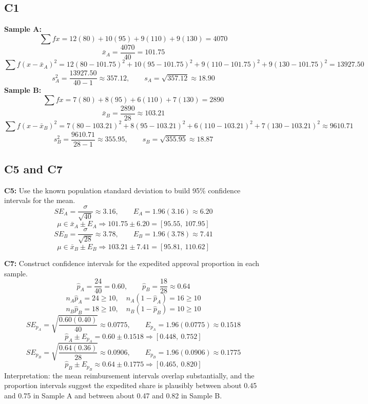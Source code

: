 \begin{ExamProblems}
		\subsection*{C1}
		\textbf{Sample A:}
		\[
		\sum f x = 12(80) + 10(95) + 9(110) + 9(130) = 4070
		\]
		\[
		\bar{x}_A = \frac{4070}{40} = 101.75
		\]
		\[
		\sum f(x-\bar{x}_A)^2 = 12(80-101.75)^2 + 10(95-101.75)^2 + 9(110-101.75)^2 + 9(130-101.75)^2 = 13927.50
		\]
		\[
		s_A^2 = \frac{13927.50}{40-1} \approx 357.12, \qquad s_A = \sqrt{357.12} \approx 18.90
		\]
		\textbf{Sample B:}
		\[
		\sum f x = 7(80) + 8(95) + 6(110) + 7(130) = 2890
		\]
		\[
		\bar{x}_B = \frac{2890}{28} \approx 103.21
		\]
		\[
		\sum f(x-\bar{x}_B)^2 = 7(80-103.21)^2 + 8(95-103.21)^2 + 6(110-103.21)^2 + 7(130-103.21)^2 \approx 9610.71
		\]
		\[
		s_B^2 = \frac{9610.71}{28-1} \approx 355.95, \qquad s_B = \sqrt{355.95} \approx 18.87
		\]

		\subsection*{C5 and C7}
		\textbf{C5:} Use the known population standard deviation to build 95\% confidence intervals for the mean.
		\[
		SE_A = \frac{\sigma}{\sqrt{40}} \approx 3.16, \qquad E_A = 1.96(3.16) \approx 6.20
		\]
		\[
		\mu \in \bar{x}_A \pm E_A \Rightarrow 101.75 \pm 6.20 = [95.55,\ 107.95]
		\]
		\[
		SE_B = \frac{\sigma}{\sqrt{28}} \approx 3.78, \qquad E_B = 1.96(3.78) \approx 7.41
		\]
		\[
		\mu \in \bar{x}_B \pm E_B \Rightarrow 103.21 \pm 7.41 = [95.81,\ 110.62]
		\]

		\textbf{C7:} Construct confidence intervals for the expedited approval proportion in each sample.
		\[
		\hat{p}_A = \frac{24}{40} = 0.60, \qquad \hat{p}_B = \frac{18}{28} \approx 0.64
		\]
		\[
		n_A\hat{p}_A = 24 \ge 10, \quad n_A(1-\hat{p}_A) = 16 \ge 10
		\]
		\[
		n_B\hat{p}_B = 18 \ge 10, \quad n_B(1-\hat{p}_B) = 10 \ge 10
		\]
		\[
		SE_{p_A} = \sqrt{\frac{0.60(0.40)}{40}} \approx 0.0775, \qquad E_{p_A} = 1.96(0.0775) \approx 0.1518
		\]
		\[
		\hat{p}_A \pm E_{p_A} = 0.60 \pm 0.1518 \Rightarrow [0.448,\ 0.752]
		\]
		\[
		SE_{p_B} = \sqrt{\frac{0.64(0.36)}{28}} \approx 0.0906, \qquad E_{p_B} = 1.96(0.0906) \approx 0.1775
		\]
		\[
		\hat{p}_B \pm E_{p_B} \approx 0.64 \pm 0.1775 \Rightarrow [0.465,\ 0.820]
		\]
		Interpretation: the mean reimbursement intervals overlap substantially, and the proportion intervals suggest the expedited share is plausibly between about 0.45 and 0.75 in Sample A and between about 0.47 and 0.82 in Sample B.


\end{ExamProblems}
